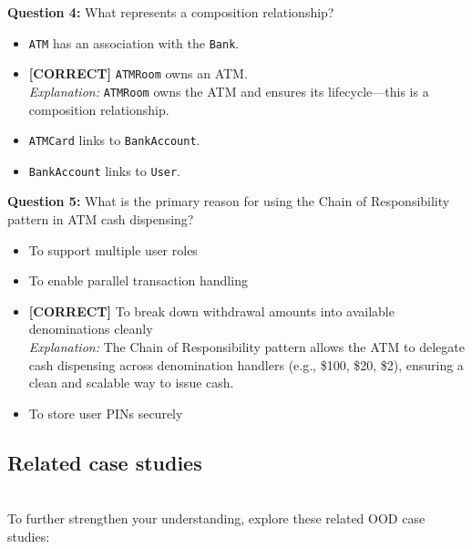 \vspace{0.3cm}
\noindent
\textbf{Question 4:} What represents a composition relationship?
\\[0.2cm]
\begin{itemize}
 \item \texttt{ATM} has an association with the \texttt{Bank}.
 \item \textbf{[CORRECT]} \texttt{ATMRoom} owns an ATM.
\\[0.1cm]
\textit{Explanation:} 
\texttt{ATMRoom} owns the ATM and ensures its lifecycle---this is a composition relationship.
 \item \texttt{ATMCard} links to \texttt{BankAccount}.
 \item \texttt{BankAccount} links to \texttt{User}.
\end{itemize}
\vspace{0.3cm}
\noindent
\textbf{Question 5:} What is the primary reason for using the Chain of Responsibility pattern in ATM cash dispensing?
\\[0.2cm]
\begin{itemize}
 \item To support multiple user roles
 \item To enable parallel transaction handling
 \item \textbf{[CORRECT]} To break down withdrawal amounts into available denominations cleanly
\\[0.1cm]
\textit{Explanation:} 
The Chain of Responsibility pattern allows the ATM to delegate cash dispensing across denomination handlers (e.g., \$100, \$20, \$2), ensuring a clean and scalable way to issue cash.
 \item To store user PINs securely
\end{itemize}

\subsection{Related case studies}\label{EclVEz7Y3wdcP1WAXFBBz}
\\
To further strengthen your understanding, explore these related OOD case studies:

